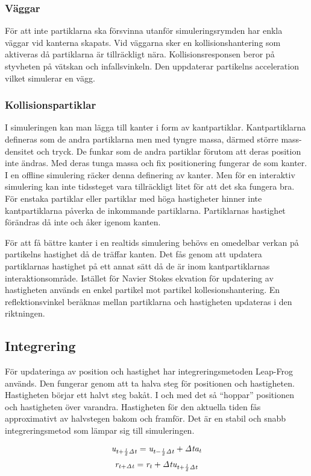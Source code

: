 \documentclass[a4paper,12pt,oneside,final]{extarticle}
\begin{document}
\subsubsection{Väggar}
För att inte partiklarna ska försvinna utanför simuleringsrymden har enkla väggar vid kanterna skapats.
Vid väggarna sker en kollisionshantering som aktiveras då partiklarna är tillräckligt nära.
Kollisionsresponsen beror på styvheten på vätskan och infallsvinkeln.
Den uppdaterar partikelns acceleration vilket simulerar en vägg. 
\subsubsection{Kollisionspartiklar}
I simuleringen kan man lägga till kanter i form av kantpartiklar.
Kantpartiklarna defineras som de andra partiklarna men med tyngre massa, därmed större mass-densitet och tryck.
De funkar som de andra partiklar förutom att deras position inte ändras.
Med deras tunga massa och fix positionering fungerar de som kanter.
I en offline simulering räcker denna definering av kanter.
Men för en interaktiv simulering kan inte tidssteget vara tillräckligt litet för att det ska fungera bra.
För enstaka partiklar eller partiklar med höga hastigheter hinner inte kantpartiklarna påverka de inkommande partiklarna.
Partiklarnas hastighet förändras då inte och åker igenom kanten. 

För att få bättre kanter i en realtids simulering behövs en omedelbar verkan på partikelns hastighet då de träffar kanten.
Det fås genom att updatera partiklarnas hastighet på ett annat sätt då de är inom kantpartiklarnas interaktionsområde.
Istället för Navier Stokes ekvation för updatering av hastigheten används en enkel partikel mot partikel kollesionshantering.
En reflektionsvinkel beräknas mellan partiklarna och hastigheten updateras i den riktningen.

\subsection{Integrering}
För updateringa av position och hastighet har integreringsmetoden Leap-Frog används. Den fungerar genom att ta halva steg för positionen och hastigheten.
Hastigheten börjar ett halvt steg bakåt.
I och med det så “hoppar” positionen och hastigheten över varandra.
Hastigheten för den aktuella tiden fås approximativt av halvstegen bakom och framför.
Det är en stabil och snabb integreringsmetod som lämpar sig till simuleringen.

\begin{equation}
{\it u_{t + \frac{1}{2} \Delta t} = u_{t - \frac{1}{2} \Delta t} + \Delta t a_t}
\end{equation}
\begin{equation}
{\it r_{t+ \Delta t} = r_t + \Delta t u_{t + \frac{1}{2} \Delta t }}
\end{equation}
\end{document}
